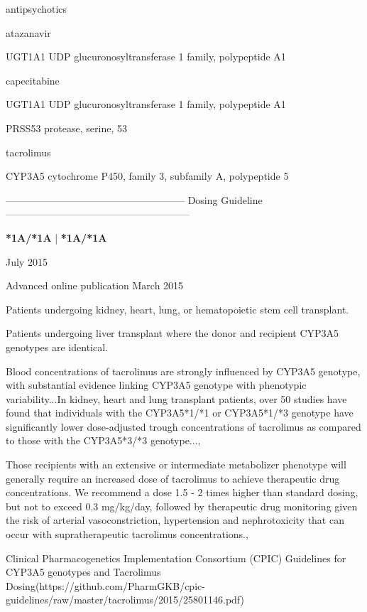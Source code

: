 \documentclass{resume} %
\begin{document}
\begin{rSection}{ antipsychotics }
\begin{rSection}{ atazanavir }
\begin{rSubsection}{ UGT1A1 }{ UDP glucuronosyltransferase 1 family, polypeptide A1 }{}{}
\begin{rSection}{ capecitabine }
\begin{rSubsection}{ UGT1A1 }{ UDP glucuronosyltransferase 1 family, polypeptide A1 }{}{}
\begin{rSubsection}{ PRSS53 }{ protease, serine, 53 }{}{}
\begin{rSection}{ tacrolimus }
\item[]
\begin{rSubsection}{ CYP3A5 }{ cytochrome P450, family 3, subfamily A, polypeptide 5 }{}{}
\item[]
\item[] ------------------------------------------------------ Dosing Guideline --------------------------------------------------------\newline
\item[]
\item[] \textbf{ *1A/*1A } | \textbf{ *1A/*1A }
\item July 2015
 \newline
\item Advanced online publication March 2015
 \newline
\item Patients undergoing kidney, heart, lung, or hematopoietic stem cell transplant.
 \newline
\item Patients undergoing liver transplant where the donor and recipient CYP3A5 genotypes are identical.
 \newline
\item Blood concentrations of tacrolimus are strongly influenced by CYP3A5 genotype, with substantial evidence linking CYP3A5 genotype with phenotypic variability...In kidney, heart and lung transplant patients, over 50 studies have found that individuals with the CYP3A5*1/*1 or CYP3A5*1/*3 genotype have significantly lower dose-adjusted trough concentrations of tacrolimus as compared to those with the CYP3A5*3/*3 genotype..., 
 \newline
\item Those recipients with an extensive or intermediate metabolizer phenotype will generally require an increased dose of tacrolimus to achieve therapeutic drug concentrations. We recommend a dose 1.5 - 2 times higher than standard dosing, but not to exceed 0.3 mg/kg/day, followed by therapeutic drug monitoring given the risk of arterial vasoconstriction, hypertension and nephrotoxicity that can occur with supratherapeutic tacrolimus concentrations.,  
 \newline
\item Clinical Pharmacogenetics Implementation Consortium (CPIC) Guidelines for CYP3A5 genotypes and Tacrolimus Dosing(https://github.com/PharmGKB/cpic-guidelines/raw/master/tacrolimus/2015/25801146.pdf) 
 \newline

\end{rSubsection}
\end{rSection}
\end{rSubsection}
\end{rSubsection}
\end{rSection}
\end{rSubsection}
\end{rSection}
\end{rSection}
\end{document}

